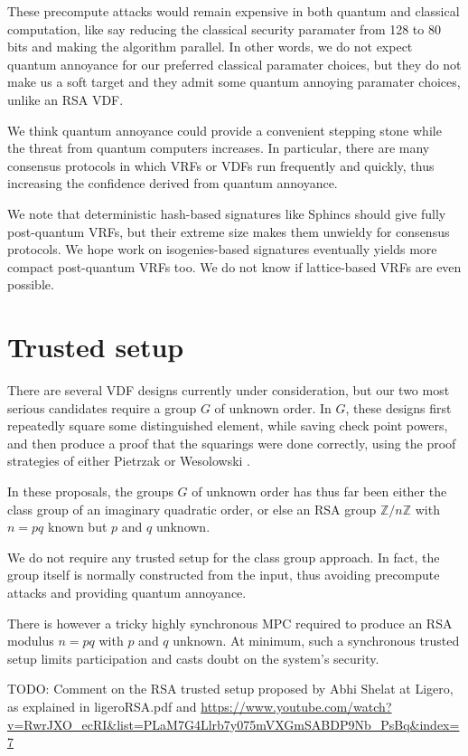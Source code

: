 \documentclass{article}
\newcommand{\Z}{\mathbb{Z}}
\begin{document}
These precompute attacks would remain expensive in both quantum and
classical computation, like say reducing the classical security
paramater from 128 to 80 bits and making the algorithm parallel. 
In other words, we do not expect quantum annoyance for our preferred
classical paramater choices, but they do not make us a soft target
and they admit some quantum annoying paramater choices, 
unlike an RSA VDF.

We think quantum annoyance could provide a convenient stepping stone
while the threat from quantum computers increases.  In particular,
there are many consensus protocols in which VRFs or VDFs run frequently
and quickly, thus increasing the confidence derived from quantum annoyance.  

We note that deterministic hash-based signatures like Sphincs should
give fully post-quantum VRFs, but their extreme size makes them
unwieldy for consensus protocols.  We hope work on isogenies-based
signatures eventually yields more compact post-quantum VRFs too.
We do not know if lattice-based VRFs are even possible.


\section{Trusted setup}

There are several VDF designs currently under consideration, but
our two most serious candidates require a group $G$ of unknown order.
In $G$, these designs first repeatedly square some distinguished
element, while saving check point powers, and then produce a proof
that the squarings were done correctly, using the proof strategies
of either Pietrzak \cite{Pietrzak} or Wesolowski \cite{Wesolowski}.

In these proposals, the groups $G$ of unknown order has thus far been
either the class group of an imaginary quadratic order, or else an
RSA group $\Z/n\Z$ with $n = p q$ known but $p$ and $q$ unknown.

We do not require any trusted setup for the class group approach.
In fact, the group itself is normally constructed from the input,
thus avoiding precompute attacks and providing quantum annoyance.  

There is however a tricky highly synchronous MPC required to produce
an RSA modulus $n = p q$ with $p$ and $q$ unknown.  At minimum, such
a synchronous trusted setup limits participation and casts doubt on
the system's security.  

TODO: Comment on the RSA trusted setup proposed by Abhi Shelat at Ligero, as explained in ligeroRSA.pdf and  \url{https://www.youtube.com/watch?v=RwrJXO_ecRI&list=PLaM7G4Llrb7y075mVXGmSABDP9Nb_PsBq&index=7}
\end{document}
